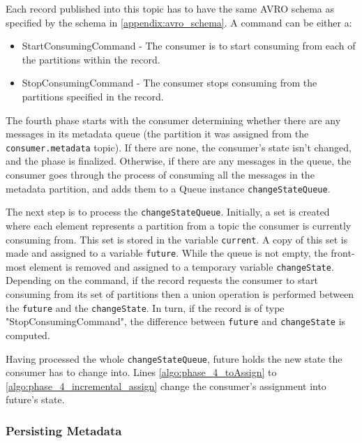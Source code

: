 Each record published into this topic has to have the same AVRO schema as
specified by the schema in \ref{appendix:avro_schema}. A command can be either
a: 
\begin{itemize} 
    \item StartConsumingCommand - The consumer is to start
        consuming from each of the partitions within the record.  
    \item StopConsumingCommand - The consumer stops consuming from the
        partitions specified in the record.  
\end{itemize}

The fourth phase starts with the consumer determining whether there are any
messages in its metadata queue (the partition it was assigned from the
\lstinline[language=Python]{consumer.metadata} topic). If there are
none, the consumer's state isn't changed, and the phase is finalized. Otherwise,
if there are any messages in the queue, the consumer goes through the process of
consuming all the messages in the metadata partition, and adds them to a Queue
instance \lstinline[language=Python]{changeStateQueue}.

The next step is to process the \lstinline[language=Python]{changeStateQueue}.
Initially, a set is created where each element represents a partition from a
topic the consumer is currently consuming from. This set is stored in the
variable \lstinline[language=Python]{current}. A copy of this set is made and
assigned to a variable \lstinline[language=Python]{future}. While the queue is
not empty, the front-most element is removed and assigned to a temporary
variable \lstinline[language=Python]{changeState}. Depending on the command, if
the record requests the consumer to start consuming from its set of partitions
then a union operation is performed between the
\lstinline[language=Python]{future} and the
\lstinline[language=Python]{changeState}. In turn, if the record is of type
"StopConsumingCommand", the difference between \lstinline{future} and
\lstinline{changeState} is computed.

Having processed the whole \lstinline[language=Python]{changeStateQueue}, future
holds the new state the consumer has to change into. Lines
\ref{algo:phase_4_toAssign} to \ref{algo:phase_4_incremental_assign} change the
consumer's assignment into future's state.

\subsubsection{Persisting Metadata}


